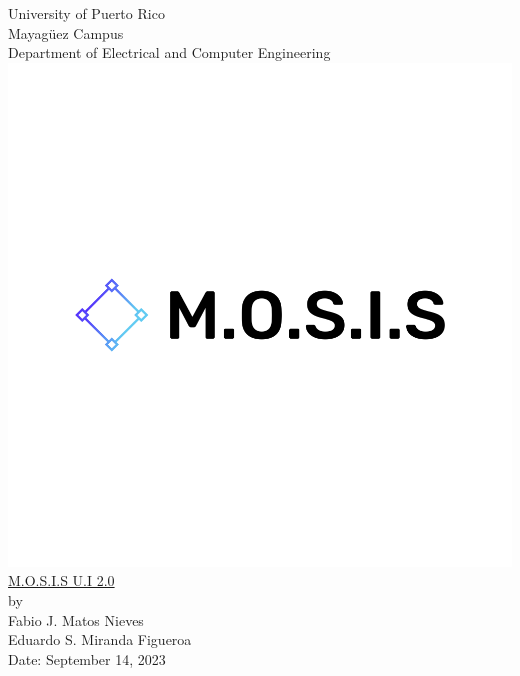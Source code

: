 \linespread{1.0}
\begin{titlepage}
  \begin{center}
    \large{University of Puerto Rico\\
    Mayagüez Campus\\
    \vspace{\baselineskip}
    Department of Electrical and Computer Engineering}
  \includegraphics[scale=0.2]{../M.O.S.I.S Logo/default.png}\\
    \Huge{\underline{M.O.S.I.S U.I 2.0}\\}
    \vspace{6cm}
    \large by\\
    Fabio J. Matos Nieves\\
    Eduardo S. Miranda Figueroa\\
    Date: September 14, 2023\\
    \normalsize

  \end{center}
\end{titlepage}
